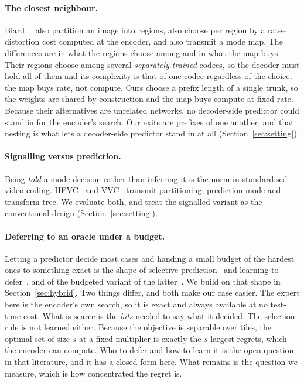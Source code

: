\documentclass[10pt,twocolumn,letterpaper]{article}
\begin{document}
\paragraph{The closest neighbour.} Blard~\etal~\cite{spatialcompetition} also
partition an image into regions, also choose per region by a rate--distortion
cost computed at the encoder, and also transmit a mode map. The differences are
in what the regions choose among and in what the map buys. Their regions choose
among several \emph{separately trained} codecs, so the decoder must hold all of
them and its complexity is that of one codec regardless of the choice; the map
buys rate, not compute. Ours choose a prefix length of a single trunk, so the weights are shared
by construction and the map buys compute at fixed rate. Because their
alternatives are unrelated networks, no decoder-side predictor could stand in for
the encoder's search. Our exits are prefixes of one another, and that nesting is
what lets a decoder-side predictor stand in at all (Section~\ref{sec:setting}).

\paragraph{Signalling versus prediction.} Being \emph{told} a mode decision
rather than inferring it is the norm in standardised video coding.
HEVC~\cite{hevc} and VVC~\cite{vvc} transmit partitioning, prediction mode and
transform tree. We evaluate both, and treat the signalled variant as the
conventional design (Section~\ref{sec:setting}).

\paragraph{Deferring to an oracle under a budget.} Letting a predictor decide
most cases and handing a small budget of the hardest ones to something exact is
the shape of selective prediction~\cite{geifman2017selective} and learning to
defer~\cite{madras2018l2d,mozannar2020consistent}, and of the budgeted variant of
the latter~\cite{desalvo2025budgeted}. We build on that shape in
Section~\ref{sec:hybrid}. Two things differ, and both make our case easier. The
expert here is the encoder's own search, so it is exact and always available at
no test-time cost. What is scarce is the
\emph{bits} needed to say what it decided. The selection rule is not learned
either. Because the objective is separable over tiles, the optimal set of size
$s$ at a fixed multiplier is exactly the $s$ largest regrets, which the encoder
can compute. Who to defer and how to learn it is the open question in that
literature, and it has a closed form here. What remains is the question we
measure, which is how concentrated the regret is.
\end{document}
